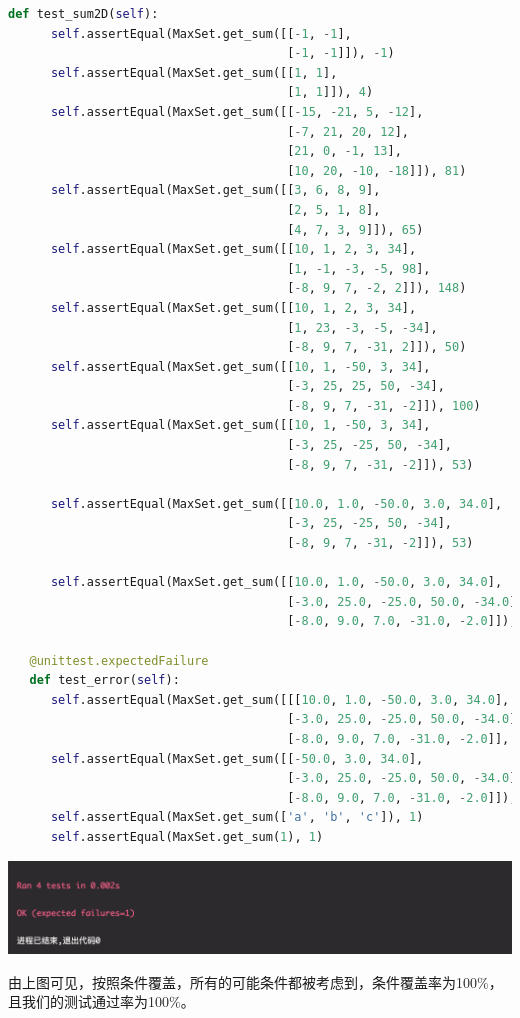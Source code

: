 \documentclass{article}
\begin{document}
\begin{lstlisting}[language = python]
   def test_sum2D(self):
      self.assertEqual(MaxSet.get_sum([[-1, -1],
                                       [-1, -1]]), -1)
      self.assertEqual(MaxSet.get_sum([[1, 1],
                                       [1, 1]]), 4)
      self.assertEqual(MaxSet.get_sum([[-15, -21, 5, -12],
                                       [-7, 21, 20, 12],
                                       [21, 0, -1, 13],
                                       [10, 20, -10, -18]]), 81)
      self.assertEqual(MaxSet.get_sum([[3, 6, 8, 9],
                                       [2, 5, 1, 8],
                                       [4, 7, 3, 9]]), 65)
      self.assertEqual(MaxSet.get_sum([[10, 1, 2, 3, 34],
                                       [1, -1, -3, -5, 98],
                                       [-8, 9, 7, -2, 2]]), 148)
      self.assertEqual(MaxSet.get_sum([[10, 1, 2, 3, 34],
                                       [1, 23, -3, -5, -34],
                                       [-8, 9, 7, -31, 2]]), 50)
      self.assertEqual(MaxSet.get_sum([[10, 1, -50, 3, 34],
                                       [-3, 25, 25, 50, -34],
                                       [-8, 9, 7, -31, -2]]), 100)
      self.assertEqual(MaxSet.get_sum([[10, 1, -50, 3, 34],
                                       [-3, 25, -25, 50, -34],
                                       [-8, 9, 7, -31, -2]]), 53)

      self.assertEqual(MaxSet.get_sum([[10.0, 1.0, -50.0, 3.0, 34.0],
                                       [-3, 25, -25, 50, -34],
                                       [-8, 9, 7, -31, -2]]), 53)

      self.assertEqual(MaxSet.get_sum([[10.0, 1.0, -50.0, 3.0, 34.0],
                                       [-3.0, 25.0, -25.0, 50.0, -34.0],
                                       [-8.0, 9.0, 7.0, -31.0, -2.0]]), 53)

   @unittest.expectedFailure
   def test_error(self):
      self.assertEqual(MaxSet.get_sum([[[10.0, 1.0, -50.0, 3.0, 34.0],
                                       [-3.0, 25.0, -25.0, 50.0, -34.0],
                                       [-8.0, 9.0, 7.0, -31.0, -2.0]], [[1]]]), 53)
      self.assertEqual(MaxSet.get_sum([[-50.0, 3.0, 34.0],
                                       [-3.0, 25.0, -25.0, 50.0, -34.0],
                                       [-8.0, 9.0, 7.0, -31.0, -2.0]]), 53)
      self.assertEqual(MaxSet.get_sum(['a', 'b', 'c']), 1)
      self.assertEqual(MaxSet.get_sum(1), 1)

\end{lstlisting}
\begin{center}
   \includegraphics[scale = 0.62]{3.png}
\end{center}
由上图可见，按照条件覆盖，所有的可能条件都被考虑到，条件覆盖率为100\%，且我们的测试通过率为100\%。
\end{document}
